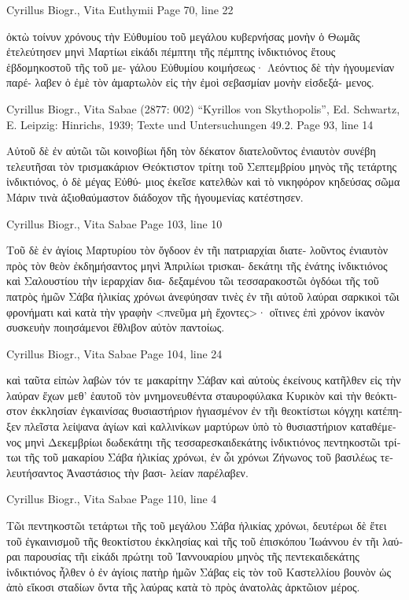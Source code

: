 \documentclass[12pt,letterpaper,twoside,final]{memoir}
\begin{document}
\begin{greek}
Cyrillus Biogr., Vita Euthymii 
Page 70, line 22

                             ὀκτὼ τοίνυν χρόνους τὴν Εὐθυμίου τοῦ 
μεγάλου κυβερνήσας μονὴν ὁ Θωμᾶς ἐτελεύτησεν μηνὶ Μαρτίωι εἰκάδι 
πέμπτηι τῆς πέμπτης ἰνδικτιόνος ἔτους ἑβδομηκοστοῦ τῆς τοῦ με-
γάλου Εὐθυμίου κοιμήσεως· Λεόντιος δὲ τὴν ἡγουμενίαν παρέ-
λαβεν ὁ ἐμὲ τὸν ἁμαρτωλὸν εἰς τὴν ἐμοὶ σεβασμίαν μονὴν εἰσδεξά-
μενος. 



Cyrillus Biogr., Vita Sabae (2877: 002)
“Kyrillos von Skythopolis”, Ed. Schwartz, E.
Leipzig: Hinrichs, 1939; Texte und Untersuchungen 49.2.
Page 93, line 14

Αὐτοῦ δὲ ἐν αὐτῶι τῶι κοινοβίωι ἤδη τὸν δέκατον διατελοῦντος 
ἐνιαυτὸν συνέβη τελευτῆσαι τὸν τρισμακάριον Θεόκτιστον τρίτηι 
τοῦ Σεπτεμβρίου μηνὸς τῆς τετάρτης ἰνδικτιόνος, ὁ δὲ μέγας Εὐθύ-
μιος ἐκεῖσε κατελθὼν καὶ τὸ νικηφόρον κηδεύσας σῶμα Μάριν τινὰ 
ἀξιοθαύμαστον διάδοχον τῆς ἡγουμενίας κατέστησεν. 



Cyrillus Biogr., Vita Sabae 
Page 103, line 10

Τοῦ δὲ ἐν ἁγίοις Μαρτυρίου τὸν ὄγδοον ἐν τῆι πατριαρχίαι διατε-
λοῦντος ἐνιαυτὸν πρὸς τὸν θεὸν ἐκδημήσαντος μηνὶ Ἀπριλίωι τρισκαι-
δεκάτηι τῆς ἐνάτης ἰνδικτιόνος καὶ Σαλουστίου τὴν ἱεραρχίαν δια-
δεξαμένου τῶι τεσσαρακοστῶι ὀγδόωι τῆς τοῦ πατρὸς ἡμῶν Σάβα 
ἡλικίας χρόνωι ἀνεφύησαν τινὲς ἐν τῆι αὐτοῦ λαύραι σαρκικοὶ τῶι 
φρονήματι καὶ κατὰ τὴν γραφὴν <πνεῦμα μὴ ἔχοντες>· οἵτινες 
ἐπὶ χρόνον ἱκανὸν συσκευὴν ποιησάμενοι ἔθλιβον αὐτὸν παντοίως. 



Cyrillus Biogr., Vita Sabae 
Page 104, line 24

                                                              καὶ ταῦτα 
εἰπὼν λαβὼν τόν τε μακαρίτην Σάβαν καὶ αὐτοὺς ἐκείνους κατῆλθεν 
εἰς τὴν λαύραν ἔχων μεθ' ἑαυτοῦ τὸν μνημονευθέντα σταυροφύλακα 
Κυρικὸν καὶ τὴν θεόκτιστον ἐκκλησίαν ἐγκαινίσας θυσιαστήριον 
ἡγιασμένον ἐν τῆι θεοκτίστωι κόγχηι κατέπηξεν πλεῖστα λείψανα 
ἁγίων καὶ καλλινίκων μαρτύρων ὑπὸ τὸ θυσιαστήριον καταθέμενος 
μηνὶ Δεκεμβρίωι δωδεκάτηι τῆς τεσσαρεσκαιδεκάτης ἰνδικτιόνος 
πεντηκοστῶι τρίτωι τῆς τοῦ μακαρίου Σάβα ἡλικίας χρόνωι, ἐν ὧι   
χρόνωι Ζήνωνος τοῦ βασιλέως τελευτήσαντος Ἀναστάσιος τὴν βασι-
λείαν παρέλαβεν. 



Cyrillus Biogr., Vita Sabae 
Page 110, line 4

Τῶι πεντηκοστῶι τετάρτωι τῆς τοῦ μεγάλου Σάβα ἡλικίας χρόνωι, 
δευτέρωι δὲ ἔτει τοῦ ἐγκαινισμοῦ τῆς θεοκτίστου ἐκκλησίας καὶ τῆς 
τοῦ ἐπισκόπου Ἰωάννου ἐν τῆι λαύραι παρουσίας τῆι εἰκάδι πρώτηι 
τοῦ Ἰαννουαρίου μηνὸς τῆς πεντεκαιδεκάτης ἰνδικτιόνος ἦλθεν ὁ ἐν 
ἁγίοις πατὴρ ἡμῶν Σάβας εἰς τὸν τοῦ Καστελλίου βουνὸν ὡς ἀπὸ 
εἴκοσι σταδίων ὄντα τῆς λαύρας κατὰ τὸ πρὸς ἀνατολὰς ἀρκτῶιον 
μέρος. 




\end{greek}
\end{document}
